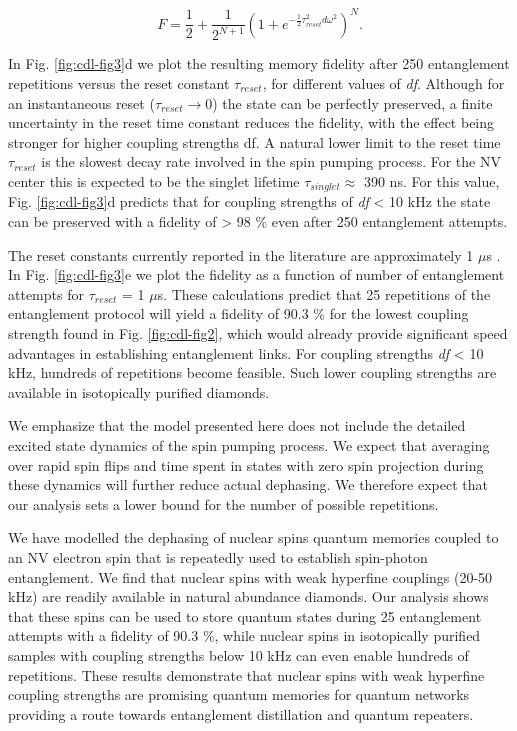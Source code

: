 \begin{equation}\label{eq:CDL-deph_an}
F = \frac{1}{2} + \frac{1}{2^{N+1}}\left(1 + e^{-\frac{1}{2}\tau_{reset} ^2 d\omega^2}\right)^N.
\end{equation}

In Fig. \ref{fig:cdl-fig3}d we plot the resulting memory fidelity after 250 entanglement repetitions versus the reset constant $\tau_{reset}$, for different values of \textit{df}. Although for an instantaneous reset ($\tau_{reset} \to 0$) the state can be perfectly preserved, a finite uncertainty in the reset time constant reduces the fidelity, with the effect being stronger for higher coupling strengths df. A natural lower limit to the reset time $\tau_{reset}$ is the slowest decay rate involved in the spin pumping process. For the NV center this is expected to be the singlet lifetime $\tau_{singlet} \approx$ 390 ns\cite{Doherty_PhysicsReports_2013}.  For this value, Fig. \ref{fig:cdl-fig3}d predicts that for coupling strengths of \textit{df} < 10 kHz the state can be preserved with a fidelity of > 98 \% even after 250 entanglement attempts. 

The reset constants currently reported in the literature are approximately 1 $\mu$s \cite{Bernien_Nature_2013}. In Fig. \ref{fig:cdl-fig3}e we plot the fidelity as a function of number of entanglement attempts for $\tau_{reset}$ = 1 $\mu$s. These calculations predict that 25 repetitions of the entanglement protocol will yield a fidelity of 90.3 \% for the lowest coupling strength found in Fig. \ref{fig:cdl-fig2}, which would already provide significant speed advantages in establishing entanglement links\cite{Campbell_Phys.Rev.Lett._2008}. For coupling strengths \textit{df} < 10 kHz, hundreds of repetitions become feasible. Such lower coupling strengths are available in isotopically purified diamonds\cite{Maurer_Science_2012}.

We emphasize that the model presented here does not include the detailed excited state dynamics of the spin pumping process. We expect that averaging over rapid spin flips and time spent in states with zero spin projection during these dynamics will further reduce actual dephasing. We therefore expect that our analysis sets a lower bound for the number of possible repetitions.

We have modelled the dephasing of nuclear spins quantum memories coupled to an NV electron spin that is repeatedly used to establish spin-photon entanglement. We find that nuclear spins with weak hyperfine couplings (20-50 kHz) are readily available in natural abundance diamonds. Our analysis shows that these spins can be used to store quantum states during 25 entanglement attempts with a fidelity of 90.3 \%, while nuclear spins in isotopically purified samples with coupling strengths below 10 kHz can even enable hundreds of repetitions. These results demonstrate that nuclear spins with weak hyperfine coupling strengths are promising quantum memories for quantum networks providing a route towards entanglement distillation and quantum repeaters.

